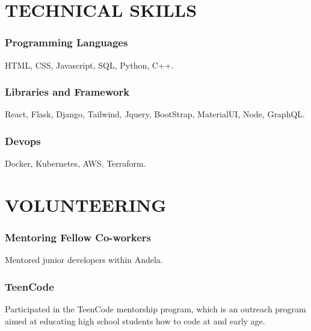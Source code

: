 \documentclass{article}
\begin{document}
\section{TECHNICAL SKILLS}
\subsubsection{Programming Languages}
HTML, CSS, Javascript, SQL, Python, C++.
\subsubsection{Libraries and Framework}
React, Flask, Django, Tailwind, Jquery, BootStrap, MaterialUI, Node, GraphQL.
\subsubsection{Devops}
Docker, Kubernetes, AWS, Terraform.
\section{VOLUNTEERING}
\subsubsection{Mentoring Fellow Co-workers}
\begin{description}[font=$\bullet$~\normalfont\scshape\color{red!50!black}]
  \item{Mentored junior developers within Andela.}
\end{description}
\subsubsection{TeenCode}
\begin{description}[font=$\bullet$~\normalfont\scshape\color{red!50!black}]
  \item{Participated in the TeenCode mentorship program, which is an outreach program aimed at educating high school students how to code at and early age.}
\end{description}
\end{document}
